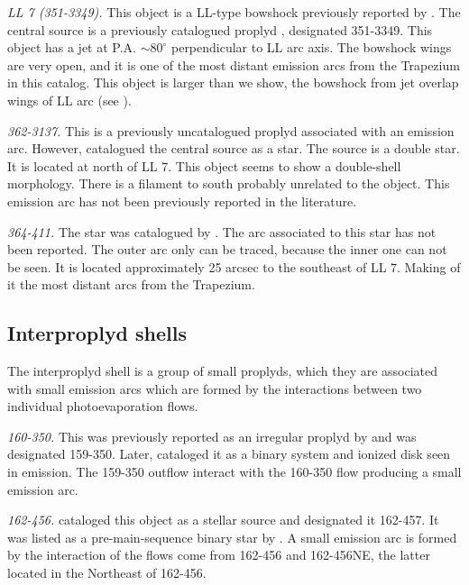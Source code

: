 \documentclass[apj, twocolumn]{aastex63}
\renewcommand\clearpage{}
\begin{document}
\textit{LL 7 (351-3349).} This object is a LL-type bowshock previously
reported by \citet{Bally:2001a}. The central source is a previously
catalogued proplyd \citep{Ricci:2008a}, designated 351-3349. This object
has a jet at P.A. $\sim 80^{\circ}$ perpendicular to LL arc axis. The
bowshock wings are very open, and it is one of the most distant emission
arcs from the Trapezium in this catalog. This object is larger than we show,
the bowshock from jet overlap wings of LL arc (see \citealp{Bally:2001a}).   

\textit{362-3137.} This is a previously uncatalogued proplyd associated
with an emission arc. However, \citet{Da-Rio:2009a} catalogued the
central source as a star. The source is a double star. It is located at
north of LL 7. This object seems to show a double-shell morphology.
There is a filament to south probably unrelated to the object. This
emission arc has not been previously reported in the literature.

\textit{364-411.} The star was catalogued by \citet{Hillenbrand:1997}.
The arc associated to this star has not been reported. The outer
arc only can be traced, because the inner one can not be seen.
It is located approximately 25 arcsec to the southeast of LL 7.
Making of it the most distant arcs from the Trapezium.

\clearpage
\subsection{Interproplyd shells}
\label{sec:interproplyd-group}



The interproplyd shell is a  group of small proplyds, which they are
associated with small emission arcs which are formed by the interactions
between two individual photoevaporation flows.
    
\textit{160-350.} This was previously reported as an irregular proplyd
by \citet{ODell:1994a} and was designated 159-350. Later, \citet{Ricci:2008a}
cataloged it as a binary system and ionized disk seen in emission.
The 159-350 outflow interact with the 160-350 flow producing a small
emission arc.  

\textit{162-456.} \citet{ODell:1996a} cataloged this object as a stellar
source and designated it 162-457. It was listed as a pre-main-sequence
binary star by \citet{Reipurth:2007a}. A small emission arc is formed by
the interaction of the flows come from 162-456 and 162-456NE, the latter
located in the Northeast of 162-456.     
\end{document}
